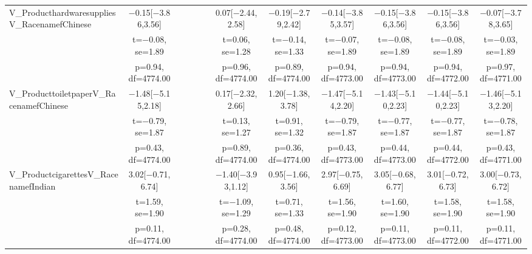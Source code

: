 \documentclass[]{report}
\begin{document}
\begin{table}
{\begin{tabular}[t]{lccccccccccc}
		V\_ProducthardwaresuppliesV\_RacenamefChinese & \num{-0.15}[\num{-3.86},\num{3.56}] &  &  &  &  & \num{0.07}[\num{-2.44},\num{2.58}] & \num{-0.19}[\num{-2.79},\num{2.42}] & \num{-0.14}[\num{-3.85},\num{3.57}] & \num{-0.15}[\num{-3.86},\num{3.56}] & \num{-0.15}[\num{-3.86},\num{3.56}] & \num{-0.07}[\num{-3.78},\num{3.65}]\\
		& t=\num{-0.08}, se=\num{1.89} &  &  &  &  & t=\num{0.06}, se=\num{1.28} & t=\num{-0.14}, se=\num{1.33} & t=\num{-0.07}, se=\num{1.89} & t=\num{-0.08}, se=\num{1.89} & t=\num{-0.08}, se=\num{1.89} & t=\num{-0.03}, se=\num{1.89}\\
		& p=\num{0.94}, df=\num{4774.00} &  &  &  &  & p=\num{0.96}, df=\num{4774.00} & p=\num{0.89}, df=\num{4774.00} & p=\num{0.94}, df=\num{4773.00} & p=\num{0.94}, df=\num{4773.00} & p=\num{0.94}, df=\num{4772.00} & p=\num{0.97}, df=\num{4771.00}\\
		V\_ProducttoiletpaperV\_RacenamefChinese & \num{-1.48}[\num{-5.15},\num{2.18}] &  &  &  &  & \num{0.17}[\num{-2.32},\num{2.66}] & \num{1.20}[\num{-1.38},\num{3.78}] & \num{-1.47}[\num{-5.14},\num{2.20}] & \num{-1.43}[\num{-5.10},\num{2.23}] & \num{-1.44}[\num{-5.10},\num{2.23}] & \num{-1.46}[\num{-5.13},\num{2.20}]\\
		& t=\num{-0.79}, se=\num{1.87} &  &  &  &  & t=\num{0.13}, se=\num{1.27} & t=\num{0.91}, se=\num{1.32} & t=\num{-0.79}, se=\num{1.87} & t=\num{-0.77}, se=\num{1.87} & t=\num{-0.77}, se=\num{1.87} & t=\num{-0.78}, se=\num{1.87}\\
		& p=\num{0.43}, df=\num{4774.00} &  &  &  &  & p=\num{0.89}, df=\num{4774.00} & p=\num{0.36}, df=\num{4774.00} & p=\num{0.43}, df=\num{4773.00} & p=\num{0.44}, df=\num{4773.00} & p=\num{0.44}, df=\num{4772.00} & p=\num{0.43}, df=\num{4771.00}\\
		V\_ProductcigarettesV\_RacenamefIndian & \num{3.02}[\num{-0.71},\num{6.74}] &  &  &  &  & \num{-1.40}[\num{-3.93},\num{1.12}] & \num{0.95}[\num{-1.66},\num{3.56}] & \num{2.97}[\num{-0.75},\num{6.69}] & \num{3.05}[\num{-0.68},\num{6.77}] & \num{3.01}[\num{-0.72},\num{6.73}] & \num{3.00}[\num{-0.73},\num{6.72}]\\
		& t=\num{1.59}, se=\num{1.90} &  &  &  &  & t=\num{-1.09}, se=\num{1.29} & t=\num{0.71}, se=\num{1.33} & t=\num{1.56}, se=\num{1.90} & t=\num{1.60}, se=\num{1.90} & t=\num{1.58}, se=\num{1.90} & t=\num{1.58}, se=\num{1.90}\\
		& p=\num{0.11}, df=\num{4774.00} &  &  &  &  & p=\num{0.28}, df=\num{4774.00} & p=\num{0.48}, df=\num{4774.00} & p=\num{0.12}, df=\num{4773.00} & p=\num{0.11}, df=\num{4773.00} & p=\num{0.11}, df=\num{4772.00} & p=\num{0.11}, df=\num{4771.00}\\

\end{tabular}}
\end{table}
\end{document}
